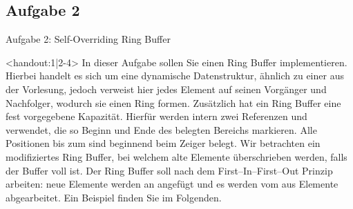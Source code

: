 \subsection{Aufgabe 2}
{\taskenum
\begin{frame}{Aufgabe 2: Self-Overriding Ring Buffer}
\begin{onlyenv}<handout:1|2-4>
    \vspace*{-.5\baselineskip}
    In dieser Aufgabe sollen Sie einen Ring Buffer implementieren. Hierbei handelt es sich um eine dynamische
    Datenstruktur, ähnlich zu einer  aus der Vorlesung, jedoch verweist hier jedes Element auf seinen
    Vorgänger und Nachfolger, wodurch sie einen Ring formen. Zusätzlich hat ein Ring Buffer eine fest vorgegebene
    Kapazität. Hierfür werden intern zwei Referenzen  und  verwendet, die so Beginn und Ende des belegten Bereichs markieren. Alle Positionen bis zum  sind beginnend beim  Zeiger belegt. Wir betrachten ein
    modifiziertes Ring Buffer, bei welchem alte Elemente überschrieben werden, falls der Buffer voll ist. Der Ring Buffer soll nach dem First--In--First--Out Prinzip arbeiten: neue Elemente werden an  angefügt und es werden vom  aus Elemente abgearbeitet. Ein Beispiel finden Sie im Folgenden.\vspace*{-.33\baselineskip}
\end{onlyenv}
\end{frame}}
